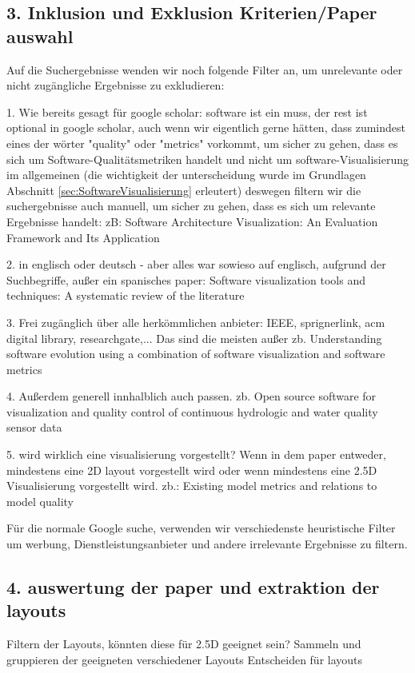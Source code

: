 \subsection*{3. Inklusion und Exklusion Kriterien/Paper auswahl} \label{sec:InklusionExklusionKriterien}
Auf die Suchergebnisse wenden wir noch folgende Filter an, um unrelevante oder nicht zugängliche Ergebnisse zu exkludieren:

1. Wie bereits gesagt für google scholar: software ist ein muss, der rest ist optional in google scholar, auch wenn wir eigentlich gerne hätten, dass zumindest eines der wörter "quality" oder "metrics" vorkommt, um sicher zu gehen, dass es sich um Software-Qualitätsmetriken handelt und nicht um software-Visualisierung im allgemeinen (die wichtigkeit der unterscheidung wurde im Grundlagen Abschnitt \ref{sec:SoftwareVisualisierung} erleutert) deswegen filtern wir die suchergebnisse auch manuell, um sicher zu gehen, dass es sich um relevante Ergebnisse handelt: zB: Software Architecture Visualization: An Evaluation Framework and Its Application \cite{gallagher2008software}

2. in englisch oder deutsch - aber alles war sowieso auf englisch, aufgrund der Suchbegriffe, außer ein spanisches paper: Software visualization tools and techniques: A systematic review of the literature\cite{cruz2016software}

3. Frei zugänglich über alle herkömmlichen anbieter: IEEE, sprignerlink, acm digital library, researchgate,... Das sind die meisten außer zb. Understanding software evolution using a combination of software visualization and software metrics \cite{lanza2002understanding}

4. Außerdem generell innhalblich auch passen. zb. Open source software for visualization and quality control of continuous hydrologic and water quality sensor data \cite{horsburgh2015open}

5. wird wirklich eine visualisierung vorgestellt? Wenn in dem paper entweder, mindestens eine 2D layout vorgestellt wird oder wenn mindestens eine 2.5D Visualisierung vorgestellt wird. zb.: Existing model metrics and relations to model quality \cite{mohagheghi2009existing}

Für die normale Google suche, verwenden wir verschiedenste heuristische Filter um werbung, Dienstleistungsanbieter und andere irrelevante Ergebnisse zu filtern.

\subsection*{4. auswertung der paper und extraktion der layouts} \label{sec:AuswertungPaper}
Filtern der Layouts, könnten diese für 2.5D geeignet sein?
Sammeln und gruppieren der geeigneten verschiedener Layouts
Entscheiden für layouts



